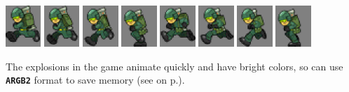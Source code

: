 \documentclass[10pt]{book}
\newcommand{\mach}[1]{\texttt{\textbf{#1}}}
\newcommand{\xref}[1]{\textit{\nameref{#1}} on  p.\pageref{#1}}
\begin{document}
\begin{CJK}{UTF8}{gkai}
\begin{center}
\includegraphics[width=0.1\textwidth]{previews/nightstrike_0-SOLDIER_RUN-00.png}
\includegraphics[width=0.1\textwidth]{previews/nightstrike_0-SOLDIER_RUN-01.png}
\includegraphics[width=0.1\textwidth]{previews/nightstrike_0-SOLDIER_RUN-02.png}
\includegraphics[width=0.1\textwidth]{previews/nightstrike_0-SOLDIER_RUN-03.png}
\includegraphics[width=0.1\textwidth]{previews/nightstrike_0-SOLDIER_RUN-04.png}
\includegraphics[width=0.1\textwidth]{previews/nightstrike_0-SOLDIER_RUN-05.png}
\includegraphics[width=0.1\textwidth]{previews/nightstrike_0-SOLDIER_RUN-06.png}
\includegraphics[width=0.1\textwidth]{previews/nightstrike_0-SOLDIER_RUN-07.png}
\end{center}

The explosions in the game animate quickly and have bright colors, so can
use \mach{ARGB2} format to save memory (see \xref{eightbit}).


\end{CJK}
\end{document}
